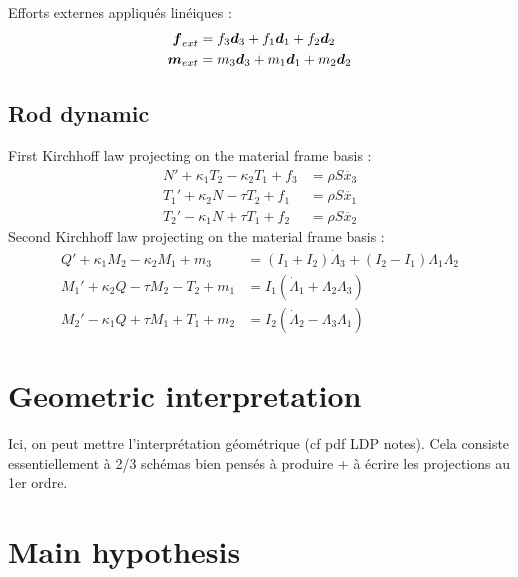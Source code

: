 Efforts externes appliqués linéiques :
\begin{subequations}
	\begin{align}
		\boldsymbol{f}_{ext} &= f_3\boldsymbol{d}_3 + f_1\boldsymbol{d}_1 + f_2\boldsymbol{d}_2
		\\
		\boldsymbol{m}_{ext} &= m_3\boldsymbol{d}_3 + m_1\boldsymbol{d}_1 + m_2\boldsymbol{d}_2
	\end{align}
\end{subequations}

\subsection{Rod dynamic}

First Kirchhoff law projecting on the material frame basis :
\begin{subequations}
	\begin{align}
		N' + \kappa_1 T_2 - \kappa_2 T_1 + f_3 &= \rho S \ddot{x_3}
		\\
		T_1' + \kappa_2 N - \tau T_2 + f_1 &= \rho S \ddot{x_1}
		\\
		T_2' - \kappa_1 N + \tau T_1 + f_2 &= \rho S \ddot{x_2}
	\end{align}
\end{subequations}
Second Kirchhoff law projecting on the material frame basis :
\begin{subequations}
	\begin{align}
		Q' + \kappa_1 M_2 - \kappa_2 M_1 + m_3 &= (I_1 + I_2)\dot{\Lambda}_3 + (I_2 - I_1)\Lambda_1\Lambda_2
		\label{eq:3_16_a}\\
		M_1' + \kappa_2 Q - \tau M_2 - T_2 + m_1 &= I_1 (\dot{\Lambda}_1 + \Lambda_2 \Lambda_3)
		\label{eq:3_16_b}\\
		M_2' - \kappa_1 Q + \tau M_1 + T_1 + m_2 &= I_2 (\dot{\Lambda}_2 - \Lambda_3 \Lambda_1)
		\label{eq:3_16_c}
	\end{align}
\end{subequations}

\section{Geometric interpretation}

Ici, on peut mettre l'interprétation géométrique (cf pdf LDP notes).
Cela consiste essentiellement à 2/3 schémas bien pensés à produire + à écrire les projections au 1er ordre.

\section{Main hypothesis}

